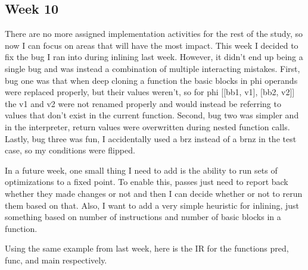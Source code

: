 \documentclass[11pt, a4paper, titlepage]{article}
\begin{document}
\subsection{Week 10}

There are no more assigned implementation activities for the rest of the study, so now I can focus on areas that will have the most impact. This week I decided to fix the bug I ran into during inlining last week. However, it didn't end up being a single bug and was instead a combination of multiple interacting mistakes. First, bug one was that when deep cloning a function the basic blocks in phi operands were replaced properly, but their values weren't, so for phi [[bb1, v1], [bb2, v2]] the v1 and v2 were not renamed properly and would instead be referring to values that don't exist in the current function. Second, bug two was simpler and in the interpreter, return values were overwritten during nested function calls. Lastly, bug three was fun, I accidentally used a brz instead of a brnz in the test case, so my conditions were flipped.

In a future week, one small thing I need to add is the ability to run sets of optimizations to a fixed point. To enable this, passes just need to report back whether they made changes or not and then I can decide whether or not to rerun them based on that. Also, I want to add a very simple heuristic for inlining, just something based on number of instructions and number of basic blocks in a function.

Using the same example from last week, here is the IR for the functions pred, func, and main respectively.
\end{document}
